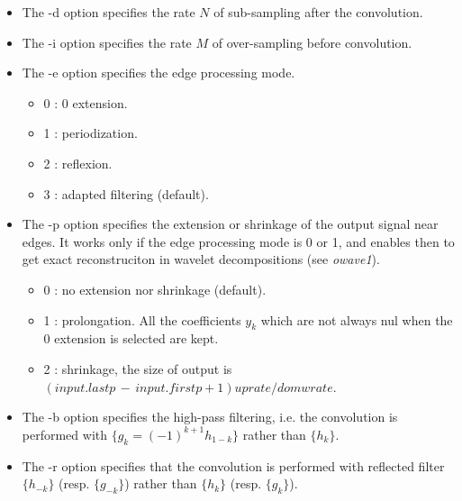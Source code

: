 \begin{itemize}
\item
The -d option specifies the rate $N$ of sub-sampling after the convolution.
\item
The -i option specifies the rate $M$ of over-sampling before convolution.
\item
The -e option specifies the edge processing mode.
\begin{itemize}
\item
0 : 0 extension.
\item
1 : periodization.
\item
2 : reflexion.
\item
3 : adapted filtering (default).
\end{itemize}
\item
The -p option specifies the extension or shrinkage of the output signal near edges. It works only if the edge processing mode is 0 or 1, and enables then to get exact reconstruciton in wavelet decompositions (see {\em owave1}).
\begin{itemize}
\item
0 : no extension nor shrinkage (default).
\item
1 : prolongation. All the coefficients $y_{k}$ which are not always nul when the 0 extension is selected are kept.
\item
2 : shrinkage, the size of output is $(input.lastp \, - \, input.firstp + 1)uprate/domwrate$.
\end{itemize}
\item
The -b option specifies the high-pass filtering, i.e. the convolution is performed with $\{ g_{k} = (-1)^{k+1} h_{1-k} \}$ rather than $\{ h_{k} \}$.
\item
The -r option specifies that the convolution is performed with reflected filter $\{ h_{-k} \}$ (resp. $\{ g_{-k} \}$) rather than $\{ h_{k} \}$ (resp. $\{ g_{k} \}$).
\end{itemize}

